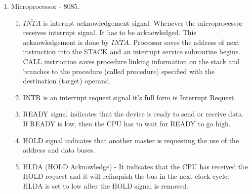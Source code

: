 \begin{enumerate}
    \item Microprocessor - 8085.
    \begin{enumerate}
        \item \( \overline{INTA} \)  is interupt acknowledgement signal. Whenever the microprocessor
              receives interrupt signal. It has to be acknowledged. This acknowledgement is done by
              \( \overline{INTA} \).  Processor saves the address of next instruction into the STACK
              and an interrupt service subroutine begins. CALL instruction saves procedure linking
              information on the stack and branches to the procedure (called procedure) specified
              with the destination (target) operand.

        \item INTR is an interrupt request signal it's full form is Interrupt Request.

        \item READY signal indicates that the device is ready to send or receive data.
              If READY is low, then the CPU has to wait for READY to go high.

        \item HOLD signal indicates that another master is requesting the use of the address and data buses.

        \item HLDA (HOLD Acknowledge) - It indicates that the CPU has received the HOLD request and it will
              relinquish the bus in the next clock cycle. HLDA is set to low after the HOLD signal is removed.

    \end{enumerate}


\end{enumerate}
